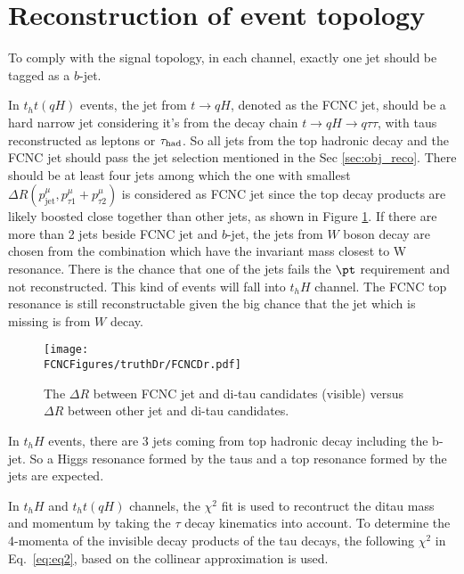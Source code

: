 \section{Reconstruction of event topology}
\label{sec:reconstruction}

To comply with the signal topology, in each channel, exactly one jet should be tagged as a $b$-jet. 

In $t_ht(qH)$ events, the jet from $t\to qH$, denoted as the FCNC jet, should be a hard narrow jet considering it's from the decay chain $t\to qH\to q\tau\tau$, with taus reconstructed as leptons or $\tau_\text{had}$. So all jets from the top hadronic decay and the FCNC jet should pass the jet selection mentioned in the Sec \ref{sec:obj_reco}. There should be at least four jets among which the one with smallest $\Delta R(p^{\mu}_{\text{jet}},p^{\mu}_{\tau1}+p^{\mu}_{\tau2})$ is considered as FCNC jet since the top decay products are likely boosted close together than other
jets, as shown in Figure \ref{fig:FCNCDr}. If there are more than 2 jets beside FCNC jet and $b$-jet, the jets from $W$ boson decay are chosen from the combination which have the invariant mass closest to W resonance. There is the chance that one of the jets fails the $\pt$ requirement and not reconstructed. This kind of events will fall into $t_hH$ channel. The FCNC top resonance is still reconstructable given the big chance that the jet which is missing is from $W$ decay.

\begin{figure}[H]
\centering
\texttt{[image: \\FCNCFigures/truthDr/FCNCDr.pdf]}
\caption{The $\Delta R$ between FCNC jet and di-tau candidates (visible) versus $\Delta R$ between other jet and di-tau candidates.}
\label{fig:FCNCDr}
\end{figure}

In $t_hH$ events, there are 3 jets coming from top hadronic decay including the b-jet. So a Higgs resonance formed by the taus and a top resonance formed by the jets are expected.

In $t_hH$ and $t_ht(qH)$ channels, the $\chi^2$ fit
is used to recontruct the ditau mass and momentum by taking the $\tau$ decay kinematics into account. To determine the 4-momenta of the invisible decay products of the tau decays, the following $\chi^2$ in Eq.~\ref{eq:eq2}, based on the collinear approximation is used.

